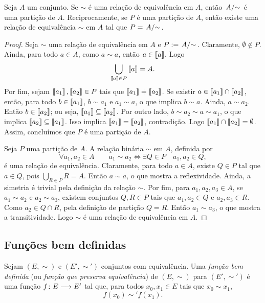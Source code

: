 \begin{theorem}
\label{conj:teo.rel.equiv.part}
	Seja $A$ um conjunto. Se $\sim$ é uma relação de equivalência em $A$, então $\quo{A}{\sim}$ é uma partição de $A$. Reciprocamente, se $P$ é uma partição de $A$, então existe uma relação de equivalência $\sim$ em $A$ tal que $P = \quo{A}{\sim}$.
\end{theorem}
\begin{proof}
	Seja $\sim$ uma relação de equivalência em $A$ e $P := \quo{A}{\sim}$. Claramente, $\emptyset \notin P$. Ainda, para todo $a \in A$, como $a \sim a$, então $a \in \left\llbracket{a}\right\rrbracket$. Logo
	\begin{equation*}
	\bigcup_{\left\llbracket{a}\right\rrbracket \in P} \left\llbracket{a}\right\rrbracket = A.
	\end{equation*}
Por fim, sejam $\left\llbracket{a_1}\right\rrbracket,\left\llbracket{a_2}\right\rrbracket \in P$ tais que $\cla{a_1} \neq \cla{a_2}$. Se existir $a \in \left\llbracket{a_1}\right\rrbracket \cap \left\llbracket{a_2}\right\rrbracket$, então, para todo $b \in \left\llbracket{a_1}\right\rrbracket$, $b \sim a_1$ e $a_1 \sim a$, o que implica $b \sim a$. Ainda, $a \sim a_2$. Então $b \in \left\llbracket{a_2}\right\rrbracket$; ou seja, $\left\llbracket{a_1}\right\rrbracket \subseteq \left\llbracket{a_2}\right\rrbracket$. Por outro lado, $b \sim a_2 \sim a \sim a_1$, o que implica $\left\llbracket{a_2}\right\rrbracket \subseteq \left\llbracket{a_1}\right\rrbracket$. Isso implica $\left\llbracket{a_1}\right\rrbracket=\left\llbracket{a_2}\right\rrbracket$, contradição. Logo $\left\llbracket{a_1}\right\rrbracket \cap \left\llbracket{a_2}\right\rrbracket=\emptyset$. Assim, concluímos que $P$ é uma partição de $A$.
	
	Seja $P$ uma partição de $A$. A relação binária $\sim$ em $A$, definida por
	\begin{equation*}
	\forall a_1,a_2 \in A \qquad a_1 \sim a_2 \Leftrightarrow \exists Q \in P \quad a_1,a_2 \in Q,
	\end{equation*}
é uma relação de equivalência. Claramente, para todo $a \in A$, existe $Q \in P$ tal que $a \in Q$, pois $\displaystyle \bigcup_{R \in P} R = A$. Então $a \sim a$, o que mostra a reflexividade. Ainda, a simetria é trivial pela definição da relação $\sim$. Por fim, para $a_1,a_2,a_3 \in A$, se $a_1 \sim a_2$ e $a_2 \sim a_3$, existem conjuntos $Q,R \in P$ tais que $a_1,a_2 \in Q$ e $a_2,a_3 \in R$. Como $a_2 \in Q \cap R$, pela definição de partição $Q=R$. Então $a_1 \sim a_3$, o que mostra a transitividade. Logo $\sim$ é uma relação de equivalência em $A$.
\end{proof}

\subsection{Funções bem definidas}

\begin{definition}
	Sejam $(E,\sim)$ e $(E',\sim')$ conjuntos com equivalência. Uma \emph{função bem definida} (ou \emph{função que preserva equivalência}) de $(E,\sim)$ para $(E',\sim')$ é uma função ${f}\colon {E} \longrightarrow {E'}$ tal que, para todos $x_0,x_1 \in E$ tais que $x_0 \sim x_1$,
		\begin{equation*}
			f(x_0) \sim' f(x_1).
		\end{equation*}
\end{definition}

